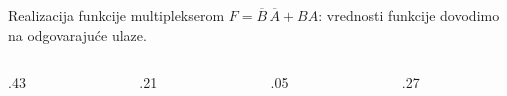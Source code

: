 \begin{frame}[label=03-s014]{Realizacija funkcije multiplekserom}
\textcolor{DEisticanje}{\(F=\overline B\,\overline A+BA\)}: vrednosti funkcije dovodimo na odgovarajuće ulaze.
\par\vspace{2mm}
\begingroup
\def\DEoznsize{9}\def\DEoblik{.6}\def\DEvisina{.64cm}\def\DEdekmod{1}\def\DEcs{0}\def\DEprimer{0}\def\DEjedinica{.75cm}
\begin{columns}[c,onlytextwidth]
\begin{column}{.43\textwidth}\centering

\end{column}
\begin{column}{.21\textwidth}\centering

\end{column}
\begin{column}{.05\textwidth}\centering
{}
\end{column}
\begin{column}{.27\textwidth}\centering
\def\DEprimer{1}
\end{column}
\end{columns}
\endgroup
\end{frame}
